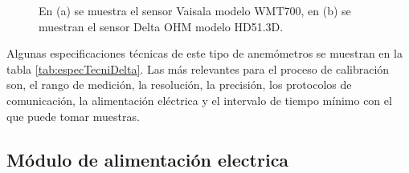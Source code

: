 \begin{figure}[H]
\begin{minipage}[b]{0.45\textwidth}
    \end{minipage}
    \caption{En (a) se muestra el sensor Vaisala modelo WMT700, en (b) se muestran el sensor Delta OHM modelo HD51.3D.}
    \label{fig:SensoresUtilizados}
\end{figure}

 Algunas especificaciones técnicas de este tipo de anemómetros se muestran en la tabla \ref{tab:especTecniDelta}. Las más relevantes para el proceso de calibración son, el rango de medición, la resolución, la precisión, los protocolos de comunicación, la alimentación eléctrica y el intervalo de tiempo mínimo con el que puede tomar muestras. 

\subsection{Módulo de alimentación electrica}\label{sec:moduloAlimentacionElectrica}

